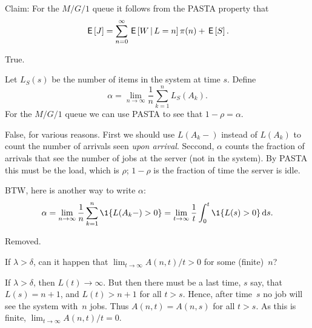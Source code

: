 \documentclass[stochastic-or.tex]{subfiles}
\begin{document}
\begin{truefalse}
Claim: For the $M/G/1$ queue it follows from the PASTA property that
 \begin{equation*}
\,\mathsf{E}\left[J\right] = \sum_{n=0}^\infty \,\mathsf{E}\left[W \,\middle|\, L=n\right] \pi(n) + \,\mathsf{E}\left[S\right].
 \end{equation*}
\begin{solution}
True.
\end{solution}
\end{truefalse}

\begin{truefalse}
Let $L_{S}(s)$ be the number of items in the system at time $s$.
Define
\begin{equation*}
\alpha = \lim_{n\to\infty} \frac 1 n \sum_{k=1}^n L_{S}(A_k).
\end{equation*}
For the $M/G/1$ queue we can use PASTA to see that $1-\rho = \alpha$.
\begin{solution} False, for various reasons. First we should use  $L(A_{k}-)$ instead of $L(A_{k})$ to count the number of arrivals seen \emph{upon arrival}.  Seccond, $\alpha$ counts the fraction of arrivals that see the number of jobs at the server (not in the system). By PASTA this must be the load, which is $\rho$; $1-\rho$ is the fraction of time the server is idle.

BTW, here is another way to write $\alpha$:
\begin{equation*}
\alpha = \lim_{n\to\infty} \frac 1 n \sum_{k=1}^n \1{L(A_k-) > 0} = \lim_{t\to\infty} \frac{1}{t}\int_0^{t} \1{L(s) > 0}\d s.
\end{equation*}
\end{solution}
\end{truefalse}

\begin{exercise}\label{ex:36}
Removed.
\end{exercise}

\begin{exercise} \label{ex:38}
If $\lambda>\delta$, can it happen that $ \lim_{t\to\infty} A(n,t)/t > 0$ for some (finite)~$n$?
\begin{solution}
 If $\lambda > \delta$, then $L(t)\to\infty$.
 But then there must be a last time, $s$ say, that $L(s) = n+1$, and $L(t) > n+1$ for all $t>s$.
 Hence, after time~$s$ no job will see the system with~$n$ jobs.
 Thus $A(n,t) = A(n,s)$ for all $t>s$.
As this is  finite, $\lim_{t\to\infty}A(n,t)/t=0$.
\end{solution}
\end{exercise}
\end{document}
